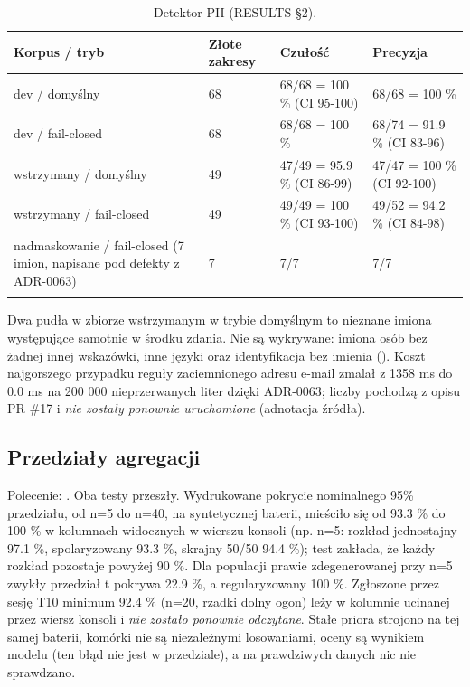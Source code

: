 {\small
\begin{longtable}{@{}p{5.2cm}p{1.6cm}p{3.7cm}p{3.7cm}@{}}
\toprule
\textbf{Korpus / tryb} & \textbf{Złote zakresy} & \textbf{Czułość} & \textbf{Precyzja} \\
\midrule
\endhead
dev / domyślny & 68 & 68/68 = 100 \% (CI 95-100) & 68/68 = 100 \% \\
dev / fail-closed & 68 & 68/68 = 100 \% & 68/74 = 91.9 \% (CI 83-96) \\
wstrzymany / domyślny & 49 & 47/49 = 95.9 \% (CI 86-99) & 47/47 = 100 \% (CI 92-100) \\
wstrzymany / fail-closed & 49 & 49/49 = 100 \% (CI 93-100) & 49/52 = 94.2 \% (CI 84-98) \\
nadmaskowanie / fail-closed (7 imion, napisane pod defekty z ADR-0063) & 7 & 7/7 & 7/7 \\
\bottomrule
\caption{Detektor PII (RESULTS §2).}
\end{longtable}
}

Dwa pudła w zbiorze wstrzymanym w trybie domyślnym to nieznane imiona występujące samotnie w środku zdania. Nie są wykrywane: imiona osób bez żadnej innej wskazówki, inne języki oraz identyfikacja bez imienia (). Koszt najgorszego przypadku reguły zaciemnionego adresu e-mail zmalał z 1358 ms do 0.0 ms na 200 000 nieprzerwanych liter dzięki ADR-0063; liczby pochodzą z opisu PR \#17 i \emph{nie zostały ponownie uruchomione} (adnotacja źródła).

\subsection{Przedziały agregacji}

Polecenie: . Oba testy przeszły. Wydrukowane pokrycie nominalnego 95\% przedziału, od n=5 do n=40, na syntetycznej baterii, mieściło się od 93.3 \% do 100 \% w kolumnach widocznych w wierszu konsoli (np. n=5: rozkład jednostajny 97.1 \%, spolaryzowany 93.3 \%, skrajny 50/50 94.4 \%); test zakłada, że każdy rozkład pozostaje powyżej 90 \%. Dla populacji prawie zdegenerowanej przy n=5 zwykły przedział t pokrywa 22.9 \%, a regularyzowany 100 \%. Zgłoszone przez sesję T10 minimum 92.4 \% (n=20, rzadki dolny ogon) leży w kolumnie ucinanej przez wiersz konsoli i \emph{nie zostało ponownie odczytane}. Stałe priora strojono na tej samej baterii, komórki nie są niezależnymi losowaniami, oceny są wynikiem modelu (ten błąd nie jest w przedziale), a na prawdziwych danych nic nie sprawdzano.

